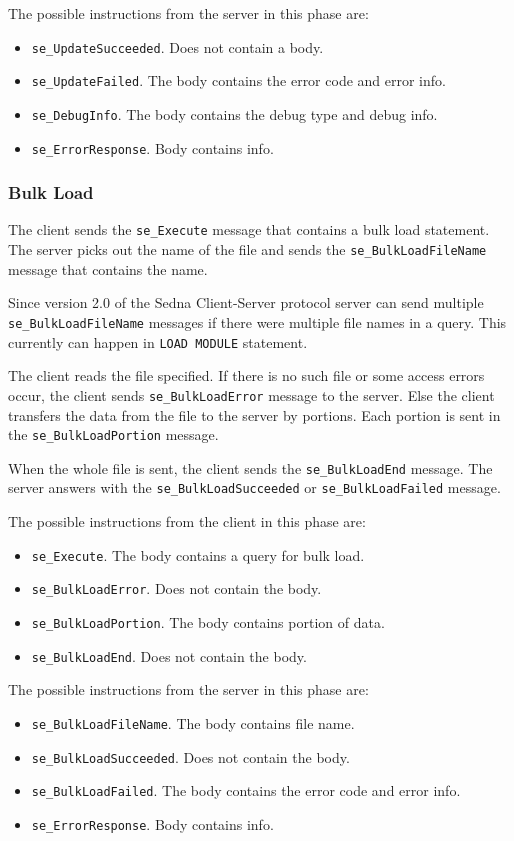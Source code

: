 \documentclass[a4paper,12pt]{article}
\begin{document}
The possible instructions from the server in this phase are:
\begin{itemize}
\item \verb!se_UpdateSucceeded!. Does not contain a body.
\item \verb!se_UpdateFailed!. The body contains the error code and error info.
\item \verb!se_DebugInfo!. The body contains the debug type and debug info.
\item \verb!se_ErrorResponse!. Body contains info.
\end{itemize}

\subsubsection{Bulk Load}

The client sends the \verb!se_Execute! message that contains a bulk load statement. The server picks out the name of the file and sends the \verb!se_BulkLoadFileName! message that contains the name.

Since version 2.0 of the Sedna Client-Server protocol server can send multiple \verb!se_BulkLoadFileName! messages if there were multiple file names in a query. This currently can happen in \verb!LOAD MODULE! statement.

The client reads the file specified. If there is no such file or some access errors occur, the client sends \verb!se_BulkLoadError! message to the server. Else the client transfers the data from the file to the server by portions. Each portion is sent in the \verb!se_BulkLoadPortion! message.

When the whole file is sent, the client sends the \verb!se_BulkLoadEnd! message. The server answers with the \verb!se_BulkLoadSucceeded! or \verb!se_BulkLoadFailed! message.

The possible instructions from the client in this phase are:
\begin{itemize}
\item \verb!se_Execute!. The body contains a query for bulk load.
\item \verb!se_BulkLoadError!. Does not contain the body.
\item \verb!se_BulkLoadPortion!. The body contains portion of data.
\item \verb!se_BulkLoadEnd!. Does not contain the body.
\end{itemize}

The possible instructions from the server in this phase are:
\begin{itemize}
\item \verb!se_BulkLoadFileName!. The body contains file name.
\item \verb!se_BulkLoadSucceeded!. Does not contain the body.
\item \verb!se_BulkLoadFailed!. The body contains the error code and error info.
\item \verb!se_ErrorResponse!. Body contains info.
\end{itemize}
\end{document}

